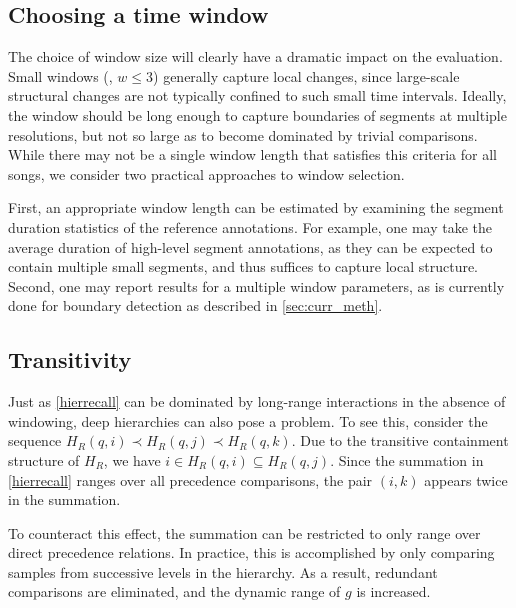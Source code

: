 \documentclass{article}
\begin{document}
\subsection{Choosing a time window}

The choice of window size will clearly have a dramatic impact on the evaluation.
Small windows (\eg, $w \leq 3$) generally capture local changes, since large-scale structural changes are not typically confined to such small time intervals.
Ideally, the window should be long enough to capture boundaries of segments at multiple resolutions, but not so large as to become dominated by trivial comparisons.
While there may not be a single window length that satisfies this criteria for all songs, we consider two practical approaches to window selection.

First, an appropriate window length can be estimated by examining the segment duration statistics of the reference annotations.  
For example, one may take the average duration of high-level segment annotations, as they can be expected to contain multiple small segments, and thus suffices to capture local structure.
Second, one may report results for a multiple window parameters, as is currently done for boundary detection as described in \cref{sec:curr_meth}.  



\subsection{Transitivity}

Just as \cref{hierrecall} can be dominated by long-range interactions in the absence
of windowing, deep hierarchies can also pose a problem.  To see this, consider the 
sequence $H_R(q, i) \prec H_R(q, j) \prec H_R(q, k)$.  Due to the transitive
containment structure of $H_R$, we have $i \in H_R(q, i) \subseteq H_R(q, j)$.
Since the summation in \cref{hierrecall} ranges over all precedence comparisons, the
pair $(i, k)$ appears twice in the summation.  

To counteract this effect, the summation can be restricted to only range over direct
precedence relations.  In practice, this is accomplished by only comparing samples from
successive levels in the hierarchy.  As a result, redundant comparisons are
eliminated, and the dynamic range of $g$ is increased.
\end{document}
